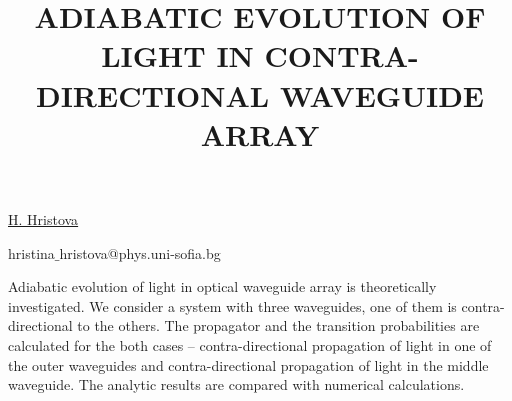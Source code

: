 \title{ADIABATIC EVOLUTION OF LIGHT IN CONTRA-DIRECTIONAL WAVEGUIDE ARRAY}

\underline{H. Hristova} 

{\normalsize{\vspace{-4mm}
\unisofia

\email hristina$\_$hristova@phys.uni-sofia.bg}}

Adiabatic evolution of light in optical waveguide array is theoretically investigated. We
consider a system with three waveguides, one of them is contra-directional to the others. The
propagator and the transition probabilities are calculated for the both cases -- contra-directional propagation of light in one of the outer waveguides and contra-directional
propagation of light in the middle waveguide. The analytic results are compared with numerical
calculations.


\vspace{\baselineskip}

